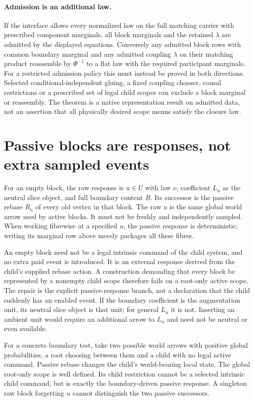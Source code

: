 \documentclass[11pt]{article}
\begin{document}
\paragraph{Admission is an additional law.}
If the interface allows every normalized law on the full matching carrier with prescribed component marginals, all block marginals and the retained $\lambda$ are admitted by the displayed equations. Conversely any admitted block rows with common boundary marginal and any admitted coupling $\lambda$ on their matching product reassemble by $\Phi^{-1}$ to a flat law with the required participant marginals. For a restricted admission policy this must instead be proved in both directions. Selected conditional-independent gluing, a fixed coupling chooser, causal restrictions or a prescribed set of legal child scopes can exclude a block marginal or reassembly. The theorem is a native representation result on admitted data, not an assertion that all physically desired scope menus satisfy the closure law.

\section{Passive blocks are responses, not extra sampled events}
For an empty block, the raw response is $u\in U$ with law $\nu$, coefficient $L_u$ as the neutral slice object, and full boundary content $B$. Its successor is the passive rebase $R_u$ of every old vertex in that block. The raw $u$ is the same global world arrow used by active blocks. It must not be freshly and independently sampled. When working fibrewise at a specified $u$, the passive response is deterministic; writing its marginal row above merely packages all these fibres.

An empty block need not be a legal intrinsic command of the child system, and no extra paid event is introduced. It is an external response derived from the child's supplied rebase action. A construction demanding that every block be represented by a nonempty child scope therefore fails on a root-only active scope. The repair is the explicit passive-response branch, not a declaration that the child suddenly has an enabled event. If the boundary coefficient is the augmentation unit, its neutral slice object is that unit; for general $L_u$ it is not. Inserting an ambient unit would require an additional arrow to $L_u$ and need not be neutral or even available.

For a concrete boundary test, take two possible world arrows with positive global probabilities, a root choosing between them and a child with no legal active command. Passive rebase changes the child's world-bearing local state. The global root-only scope is well defined. Its child restriction cannot be a selected intrinsic child command, but is exactly the boundary-driven passive response. A singleton raw block forgetting $u$ cannot distinguish the two passive successors.
\end{document}
